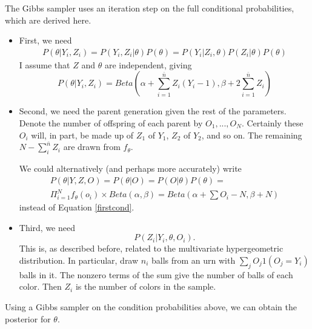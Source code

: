 \documentclass[11 pt]{article}
\renewcommand{\th}{\theta}
\newcommand{\fth}{f_{\th}}
\begin{document}
The Gibbs sampler uses an iteration step on the full conditional probabilities, which are derived here.

\begin{itemize}
  \item First, we need
\begin{align*}
P(\th | Y_i, Z_i) = P(Y_i, Z_i | \th) P(\th) = P(Y_i | Z_i, \th) P(Z_i | \th) P(\th)
\end{align*}
I assume that $Z$ and $\th$ are independent, giving
\begin{equation} \label{firstcond}
P(\th | Y_i, Z_i) = Beta(\alpha + \sum_{i = 1}^{\bar{n}} Z_i(Y_i - 1), \beta + 2 \sum_{i = 1}^{\bar{n}} Z_i)
\end{equation}

 \item Second, we need the parent generation given the rest of the parameters. Denote the number of offspring of each parent by $O_1,...,O_N$. Certainly these $O_i$ will, in part, be made up of $Z_1$ of $Y_1$, $Z_2$ of $Y_2$, and so on. The remaining $N - \sum_i^{\bar{n}}Z_i$ are drawn from $\fth$.

We could alternatively (and perhaps more accurately) write
\begin{align*}
P(\th | Y, Z, O) = P(\th | O) = P(O | \th) P(\th) = \\\Pi_{i = 1}^N \fth(o_i) \times Beta(\alpha,\beta) = Beta(\alpha + \sum O_i - N, \beta + N)
\end{align*}
instead of Equation \eqref{firstcond}.

 \item Third, we need
\[
P(Z_i | Y_i, \th, O_i).
\]
This is, as described before, related to the multivariate hypergeometric distribution. In particular, draw $n_i$ balls from an urn with $\sum_j O_j 1(O_j = Y_i)$ balls in it. The nonzero terms of the sum give the number of balls of each color. Then $Z_i$ is the number of colors in the sample. 
\end{itemize}

Using a Gibbs sampler on the condition probabilities above, we can obtain the posterior for $\th$. 
\end{document}
